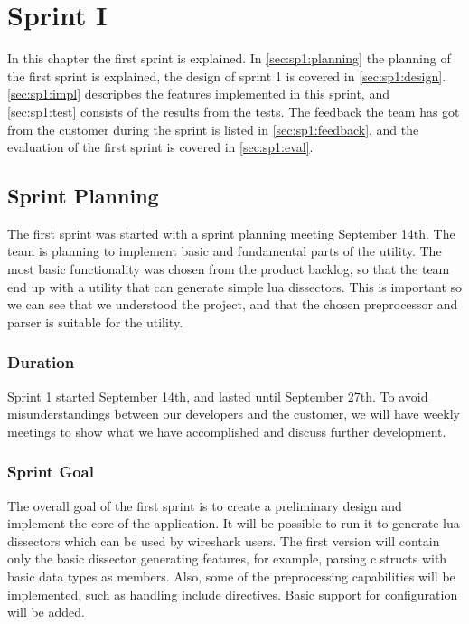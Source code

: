 \chapter{Sprint I}
In this chapter the first sprint is explained. In \autoref{sec:sp1:planning} 
the planning of the first sprint is explained, the design of sprint 1 is 
covered in \autoref{sec:sp1:design}. \autoref{sec:sp1:impl} descripbes the 
features implemented in this sprint, and \autoref{sec:sp1:test} consists of 
the results from the tests. The feedback the team has got from the customer 
during the sprint is listed in \autoref{sec:sp1:feedback}, and the evaluation 
of the first sprint is covered in \autoref{sec:sp1:eval}.


\section{Sprint Planning}
\label{sec:sp1:planning}
The first sprint was started with a sprint planning meeting September 14th. 
The team is planning to implement basic and fundamental parts of the 
\gls{utility}. The most basic functionality was chosen from the product 
backlog, so that the team end up with a utility that can generate simple 
\Gls{lua} \glspl{dissector}. This is important so we can see that we 
understood the project, and that the chosen \gls{preprocessor} and 
\gls{parser} is suitable for the utility.

\subsection{Duration}
Sprint 1 started September 14th, and lasted until September 27th. To avoid
misunderstandings between our developers and the customer, we will have weekly
meetings to show what we have accomplished and discuss further development. 

\subsection{Sprint Goal}
The overall goal of the first sprint is to create a preliminary design and
implement the core of the application. It will be possible to run it to
generate \Gls{lua} \glspl{dissector} which can be used by \Gls{wireshark} users. The first
version will contain only the basic \gls{dissector} generating features, for example,
parsing \Gls{c} \glspl{struct} with basic data types as \glspl{member}. Also, some of the
preprocessing capabilities will be implemented, such as handling \gls{include}
directives. Basic support for configuration will be added.

